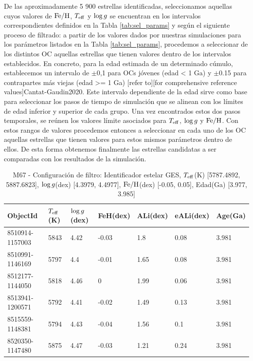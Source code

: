 De las aproximadamente 5 900 estrellas identificadas, seleccionamos aquellas cuyos valores de $\mathrm{Fe}/\mathrm{H}$, $T_{\mathrm{eff}}$ y $\mathrm{log} \, g$ se encuentran en los intervalos correspondientes definidos en la Tabla \ref{tab:sel_params} y según el siguiente proceso de filtrado: a partir de los valores dados por nuestras simulaciones para los parámetros listados en la Tabla \ref{tab:sel_params}, procedemos a seleccionar de los distintos OC aquellas estrellas que tienen valores dentro de los intervalos establecidos. En concreto, para la edad estimada de un determinado cúmulo, establecemos un intervalo de $\pm$0,1 para OCs jóvenes (edad < 1 Ga) y $\pm$0.15 para contrapartes más viejas (edad >= 1 Ga) \cite{Cantat-Gaudin2020}[refer to][for comprehensive reference values]{Cantat-Gaudin2020}. Este intervalo dependiente de la edad sirve como base para seleccionar los pasos de tiempo de simulación que se alinean con los límites de edad inferior y superior de cada grupo. Una vez encontrados estos dos pasos temporales, se reúnen los valores límite asociados para $T_{\mathrm{eff}}$, $\mathrm{log} \, g$ y $\mathrm{Fe}/\mathrm{H}$. Con estos rangos de valores procedemos entonces a seleccionar en cada uno de los OC aquellas estrellas que tienen valores para estos mismos parámetros dentro de ellos. De esta forma obtenemos finalmente las estrellas candidatas a ser comparadas con los resultados de la simulación.\par

\begin{table}
	\centering
	\begin{tabular}{l l l l l l l} 
		\hline
		ObjectId & $T_{\mathrm{eff}}$(K) & $\mathrm{log} \, g$(dex) & FeH(dex) & ALi(dex) & eALi(dex) & Age(Ga)\\
		\hline
		8510914-1157003 & 5843 & 4.42 & -0.03 & 1.8 & 0.08 & 3.981\\ 
		8510991-1146169 & 5797 & 4.4 & -0.01 & 1.65 & 0.08 & 3.981\\ 
		8512177-1144050 & 5818 & 4.46 & 0 & 1.99 & 0.06 & 3.981\\ 
		8513941-1200571 & 5792 & 4.41 & -0.02 & 1.49 & 0.13 & 3.981\\ 
		8515559-1148381 & 5794 & 4.43 & -0.04 & 1.56 & 0.1 & 3.981\\ 
		8520350-1147480 & 5875 & 4.47 & -0.03 & 1.21 & 0.24 & 3.981\\ 
		\hline
	\end{tabular}
	\caption{M67 - Configuración de filtro: Identificador estelar GES, $T_{\mathrm{eff}}$(K) [5787.4892, 5887.6823], $\mathrm{log} \, g$(dex) [4.3979, 4.4977], $\mathrm{Fe}/\mathrm{H}$(dex) [-0.05, 0.05], Edad(Ga) [3.977, 3.985]}
	\label{tab:oc_m67}
\end{table}

